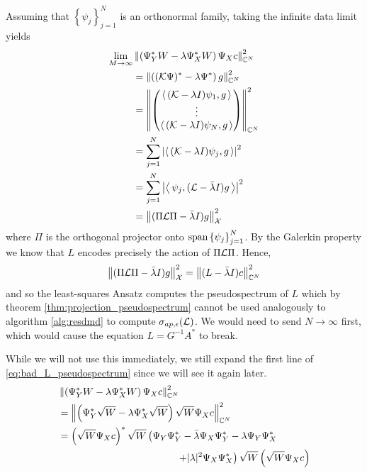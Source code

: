 Assuming that $\left\{ \psi_j \right\}_{j=1}^N$ is an orthonormal family, taking the 
infinite data limit yields
\begin{equation}
    \label{eq:bad_L_pseudospectrum}
    \begin{split}
        \lim_{M \to \infty} &
        \left\| \left( \Psi_Y^* W - \lambda \Psi_X^* W \right) \Psi_X c \right\|_{\mathbb{C}^N}^2 \\
        &= \left\| \left( (\mathcal{K} \Psi)^* - \lambda \Psi^* \right) g \right\|_{\mathbb{C}^N}^2 \\
        &= \left\| \begin{pmatrix}
            \left\langle\, (\mathcal{K} - \lambda I) \psi_1, g \,\right\rangle \\
            \vdots \\
            \left\langle\, (\mathcal{K} - \lambda I) \psi_N, g \,\right\rangle 
        \end{pmatrix} \right\|_{\mathbb{C}^N}^2 \\
        &= \sum_{j=1}^{N} \left| \left\langle\, (\mathcal{K} - \lambda I) \psi_j, g \,\right\rangle \right|^2 \\
        &= \sum_{j=1}^{N} \left| \left\langle\, \psi_j, (\mathcal{L} - \bar{\lambda} I) g \,\right\rangle \right|^2 \\
        &= \left\| (\Pi \mathcal{L} \Pi - \bar{\lambda} I) g \right\|_{\mathcal{X}}^2
    \end{split}
\end{equation}
where $\Pi$ is the orthogonal projector onto $\text{span} \left\{ \psi_j \right\}_{j=1}^N$. By 
the Galerkin property we know that $L$ encodes precisely the action of $\Pi \mathcal{L} \Pi$. Hence, 
\begin{equation}
    \label{eq:PLP}
    \left\| (\Pi \mathcal{L} \Pi - \bar{\lambda} I) g \right\|_{\mathcal{X}}^2
    = \left\| (L - \bar{\lambda} I) c \right\|_{\mathbb{C}^N}^2 
\end{equation}
and so the least-squares Ansatz computes the pseudospectrum of $L$ which by theorem 
\ref{thm:projection_pseudospectrum} 
cannot be used analogously to algorithm \ref{alg:resdmd} to compute 
$\sigma_{ap,\epsilon} (\mathcal{L})$. We would need to send $N \to \infty$ first, which would 
cause the equation $L = G^{-1} A^*$ to break. 

While we will not use this immediately, we still expand the first line of 
\ref{eq:bad_L_pseudospectrum} since we will see it again later. 
\begin{equation}
    \label{eq:L_res_expanded}
    \begin{split}
        &\left\| \left( \Psi_Y^* W - \lambda \Psi_X^* W \right) \Psi_X c \right\|_{\mathbb{C}^N}^2 \\
        &= \left\| \left( \Psi_Y^* \sqrt{W} - \lambda \Psi_X^* \sqrt{W} \right) \sqrt{W} \Psi_X c \right\|_{\mathbb{C}^N}^2 \\
        &= \left( \sqrt{W} \Psi_X c \right)^*
        \sqrt{W} \left( 
            \Psi_Y \Psi_Y^* - \bar{\lambda} \Psi_X \Psi_Y^* - \lambda \Psi_Y \Psi_X^* \right. \\
            & \quad\quad\quad\quad\quad\quad\quad\quad\quad\quad\quad\quad
            \left. + | \lambda |^2 \Psi_X \Psi_X^*
        \right) \sqrt{W}
        \left( \sqrt{W} \Psi_X c \right)
    \end{split}
\end{equation}


